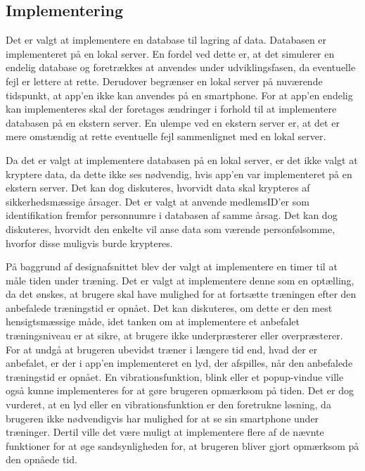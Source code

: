 \subsection{Implementering}
Det er valgt at implementere en database til lagring af data. Databasen er 
implementeret på en lokal server. En fordel ved dette er, at det simulerer en endelig database og foretrækkes at anvendes under udviklingsfasen, da eventuelle fejl er lettere at rette. Derudover begrænser en lokal server på nuværende tidspunkt, at app’en ikke kan anvendes på en smartphone. For at app’en endelig kan implementeres skal der foretages ændringer i forhold til at implementere databasen på en ekstern server.
En ulempe ved en ekstern server er, at det er mere omstændig at rette eventuelle fejl sammenlignet med en lokal server. 

Da det er valgt at implementere databasen på en lokal server, er det ikke valgt at kryptere data, da dette ikke ses nødvendig, hvis app’en var implementeret på en ekstern server. Det kan dog diskuteres, hvorvidt data skal krypteres af sikkerhedsmæssige årsager. Det er valgt at anvende medlemsID’er som identifikation fremfor personnumre i databasen af samme årsag. Det kan dog diskuteres, hvorvidt den enkelte vil anse data som værende personfølsomme, hvorfor disse muligvis burde krypteres. 

På baggrund af designafsnittet blev der valgt at implementere en timer til at måle tiden under træning. Det er valgt at implementere denne som en optælling, da det ønskes, at brugere skal have mulighed for at fortsætte træningen efter den anbefalede træningstid er opnået. Det kan diskuteres, om dette er den mest hensigtsmæssige måde, idet tanken om at implementere et anbefalet træningsniveau er at sikre, at brugere ikke underpræsterer eller overpræsterer. For at undgå at brugeren ubevidst træner i længere tid end, hvad der er anbefalet, er der i app'en implementeret en lyd, der afspilles, når den anbefalede træningstid er opnået. En vibrationsfunktion, blink eller et popup-vindue ville også kunne implementeres for at gøre brugeren opmærksom på tiden. Det er dog vurderet, at en lyd eller en vibrationsfunktion er den foretrukne løsning, da brugeren ikke nødvendigvis har mulighed for at se sin smartphone under træninger. Dertil ville det være muligt at implementere flere af de nævnte funktioner for at øge sandsynligheden for, at brugeren bliver gjort opmærksom på den opnåede tid. 


